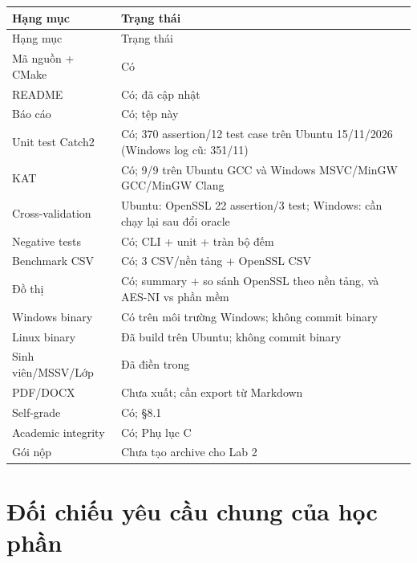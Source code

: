 \documentclass[12pt,a4paper,oneside]{report}
\let\origtexttt\texttt
\renewcommand{\texttt}[1]{\origtexttt{\seqsplit{#1}}}
\begin{document}
\begin{longtable}{p{}p{}}
\toprule
Hạng mục & Trạng thái \\
\midrule
\endfirsthead
\toprule
Hạng mục & Trạng thái \\
\midrule
\endhead
Mã nguồn + CMake & Có \\
README & Có; đã cập nhật \\
Báo cáo & Có; tệp này \\
Unit test Catch2 & Có; 370 assertion/12 test case trên Ubuntu 15/11/2026 (Windows log cũ: 351/11) \\
KAT & Có; 9/9 trên Ubuntu GCC và Windows MSVC/MinGW GCC/MinGW Clang \\
Cross-validation & Ubuntu: OpenSSL 22 assertion/3 test; Windows: cần chạy lại sau đổi oracle \\
Negative tests & Có; CLI + unit + tràn bộ đếm \\
Benchmark CSV & Có; 3 CSV/nền tảng + OpenSSL CSV \\
Đồ thị & Có; summary + so sánh OpenSSL theo nền tảng, và AES-NI vs phần mềm \\
Windows binary & Có trên môi trường Windows; không commit binary \\
Linux binary & Đã build trên Ubuntu; không commit binary \\
Sinh viên/MSSV/Lớp & Đã điền trong \texttt{REPORT.md} \\
PDF/DOCX & Chưa xuất; cần export từ Markdown \\
Self-grade & Có; §8.1 \\
Academic integrity & Có; Phụ lục C \\
Gói nộp & Chưa tạo archive cho Lab 2 \\
\bottomrule
\end{longtable}


\section{Đối chiếu yêu cầu chung của học phần}
\end{document}
